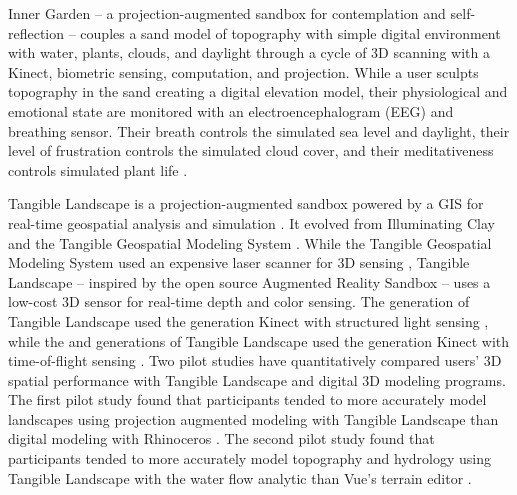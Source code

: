 \documentclass[prodmode,acmtochi]{acmsmall} %
\begin{document}
Inner Garden 
-- a projection-augmented sandbox 
for contemplation and self-reflection --
couples a sand model of topography with
simple digital environment with
water, plants, clouds, and daylight
through a cycle of 3D scanning with a Kinect, biometric sensing,
computation, and projection. 
%
While a user sculpts topography in the sand
creating a digital elevation model,
their physiological and emotional state are monitored with 
an electroencephalogram (EEG) and breathing sensor.
%
Their breath controls the simulated sea level and daylight,
their level of frustration controls the simulated cloud cover,
and their meditativeness controls simulated plant life
\cite{Roo2016}.

Tangible Landscape is a projection-augmented sandbox  
powered by a GIS for real-time geospatial analysis and simulation
\cite{Petrasova2015}. 
%
It evolved from 
Illuminating Clay \cite{Piper2002a} and 
the Tangible Geospatial Modeling System \cite{Tateosian2010}.
While the Tangible Geospatial Modeling System 
used an expensive laser scanner
for 3D sensing \cite{Tateosian2010}, 
Tangible Landscape 
-- inspired by
the open source Augmented Reality Sandbox \cite{Kreylos2012} --
uses a low-cost 3D sensor 
for real-time depth and color sensing. 
The  generation of Tangible Landscape \cite{Petrasova2014} 
used the  generation Kinect with structured light sensing \cite{Smisek2011}, 
while the   \cite{Petrasova2015} and  generations of Tangible Landscape 
used the  generation Kinect with time-of-flight sensing \cite{Bamji2015}. 
Two pilot studies have quantitatively 
compared users' 3D spatial performance 
with Tangible Landscape and digital 3D modeling programs.
%
The first pilot study found that participants tended to 
more accurately model landscapes using 
projection augmented modeling with Tangible Landscape
than digital modeling with Rhinoceros \cite{Harmon2016b}.
%
The second pilot study found that participants tended to 
more accurately model topography and hydrology
using Tangible Landscape with the water flow analytic
than Vue's terrain editor \cite{Harmon2016}. 
%

\end{document}
